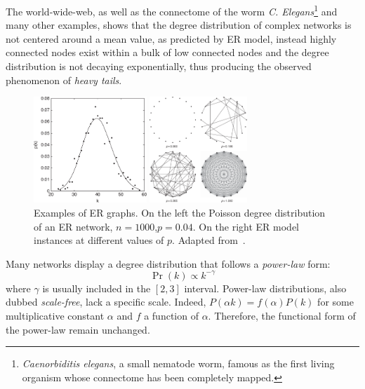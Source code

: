 The world-wide-web, as well as the connectome of the worm \emph{C.
Elegans}\footnote{\emph{Caenorbiditis elegans}, a small nematode worm, famous as the first living organism whose connectome has been completely mapped.} and many other examples, shows that the degree distribution of complex networks is not centered around a mean value, as predicted by ER model, instead highly connected nodes exist within a bulk of low connected nodes and the degree distribution is not decaying exponentially, thus producing the observed phenomenon of \emph{heavy tails}.

\begin{figure}
\centering
\begin{minipage}[b]{0.5\textwidth}\centering
\includegraphics[height=4cm]{images/deg_dist_poisson_er.pdf}
\end{minipage}\noindent
\begin{minipage}[b]{0.5\textwidth}\centering
\includegraphics[height=4cm]{images/er_graphs.pdf}
\end{minipage}
\caption{Examples of ER graphs.
On the left the Poisson degree distribution of an ER network, $n=1000$,$p=0.04$.
On the right ER model instances at different values of $p$.
Adapted from~\cite{estrada2011}.}
\label{fig:deg_dist_poisson_er}
\end{figure}

Many networks display a degree distribution that follows a \emph{power-law} form:
\begin{equation}
\Pr(k) \propto k^{-\gamma}
\end{equation}
where $\gamma$ is usually included in the $[2,3]$ interval.
Power-law distributions, also dubbed \emph{scale-free}, lack a specific scale.
Indeed, $P(\alpha k)=f(\alpha)P(k)$ for some multiplicative constant $\alpha$  and $f$ a function of $\alpha$.
Therefore, the functional form of the power-law remain unchanged.

